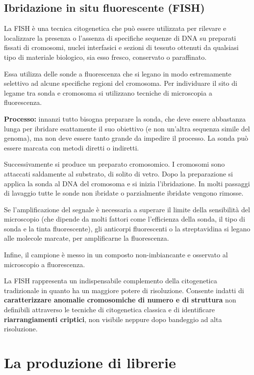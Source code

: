 \documentclass[]{article}
\begin{document}
\subsection{Ibridazione in situ fluorescente
(FISH)}\label{ibridazione-in-situ-fluorescente-fish}

La FISH è una tecnica citogenetica che può essere utilizzata per
rilevare e localizzare la presenza o l'assenza di specifiche sequenze di
DNA su preparati fissati di cromosomi, nuclei interfasici e sezioni di
tessuto ottenuti da qualsiasi tipo di materiale biologico, sia esso
fresco, conservato o paraffinato.

Essa utilizza delle sonde a fluorescenza che si legano in modo
estremamente selettivo ad alcune specifiche regioni del cromosoma. Per
individuare il sito di legame tra sonda e cromosoma si utilizzano
tecniche di microscopia a fluorescenza.

\textbf{Processo:} innanzi tutto bisogna preparare la sonda, che deve
essere abbastanza lunga per ibridare esattamente il suo obiettivo (e non
un'altra sequenza simile del genoma), ma non deve essere tanto grande da
impedire il processo. La sonda può essere marcata con metodi diretti o
indiretti.

Successivamente si produce un preparato cromosomico. I cromosomi sono
attaccati saldamente al substrato, di solito di vetro. Dopo la
preparazione si applica la sonda al DNA del cromosoma e si inizia
l'ibridazione. In molti passaggi di lavaggio tutte le sonde non ibridate
o parzialmente ibridate vengono rimosse.

Se l'amplificazione del segnale è necessaria a superare il limite della
sensibilità del microscopio (che dipende da molti fattori come
l'efficienza della sonda, il tipo di sonda e la tinta fluorescente), gli
anticorpi fluorescenti o la streptavidina si legano alle molecole
marcate, per amplificarne la fluorescenza.

Infine, il campione è messo in un composto non-imbiancante e osservato
al microscopio a fluorescenza.

La FISH rappresenta un indispensabile complemento della citogenetica
tradizionale in quanto ha un maggiore potere di risoluzione. Consente
indatti di \textbf{caratterizzare anomalie cromosomiche di numero e di
struttura} non definibili attraverso le tecniche di citogenetica
classica e di identificare \textbf{riarrangiamenti criptici}, non
visibile neppure dopo bandeggio ad alta risoluzione.

\section{La produzione di librerie}\label{la-produzione-di-librerie}
\end{document}
